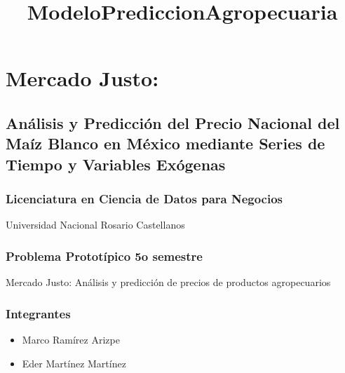 \documentclass[11pt]{article}
\title{ModeloPrediccionAgropecuaria}
\providecommand{\tightlist}{%
      \setlength{\itemsep}{0pt}\setlength{\parskip}{0pt}}
\begin{document}
    
    \maketitle
    
    

    
    \hypertarget{mercado-justo}{%
\section{Mercado Justo:}\label{mercado-justo}}

\hypertarget{anuxe1lisis-y-predicciuxf3n-del-precio-nacional-del-mauxedz-blanco-en-muxe9xico-mediante-series-de-tiempo-y-variables-exuxf3genas}{%
\subsection{Análisis y Predicción del Precio Nacional del Maíz Blanco en
México mediante Series de Tiempo y Variables
Exógenas}\label{anuxe1lisis-y-predicciuxf3n-del-precio-nacional-del-mauxedz-blanco-en-muxe9xico-mediante-series-de-tiempo-y-variables-exuxf3genas}}

\hypertarget{licenciatura-en-ciencia-de-datos-para-negocios}{%
\subsubsection{Licenciatura en Ciencia de Datos para
Negocios}\label{licenciatura-en-ciencia-de-datos-para-negocios}}

Universidad Nacional Rosario Castellanos

\hypertarget{problema-prototuxedpico-5o-semestre}{%
\subsubsection{Problema Prototípico 5o
semestre}\label{problema-prototuxedpico-5o-semestre}}

Mercado Justo: Análisis y predicción de precios de productos
agropecuarios

\hypertarget{integrantes}{%
\subsubsection{Integrantes}\label{integrantes}}

\begin{itemize}
\tightlist
\item
  Marco Ramírez Arizpe
\item
  Eder Martínez Martínez
\end{itemize}
\end{document}

